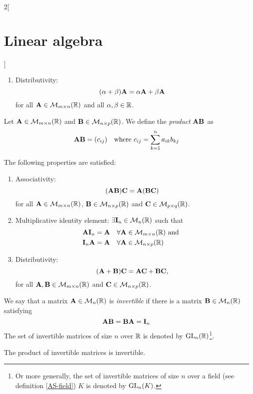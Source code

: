 \documentclass[../../../main.tex]{subfiles}
\begin{document}
\begin{multicols}{2}[\section{Linear algebra}]
\begin{prop}
\begin{enumerate}
      \item Distributivity: $$(\alpha+\beta)\vb{A}=\alpha\vb{A}+\beta\vb{A}$$ for all $\vb{A}\in\mathcal{M}_{m\times n}(\mathbb{R})$ and all $\alpha,\beta\in\mathbb{R}$.
    \end{enumerate}
  \end{prop}
  \begin{definition}
    Let $\vb{A}\in\mathcal{M}_{m\times n}(\mathbb{R})$ and $\vb{B}\in\mathcal{M}_{n\times p}(\mathbb{R})$. We define the \textit{product $\vb{A}\vb{B}$} as $$\vb{A}\vb{B}=(c_{ij})\quad\text{where }c_{ij}=\sum_{k=1}^na_{ik}b_{kj}$$
  \end{definition}
  \begin{prop}
    The following properties are satisfied:
    \begin{enumerate}
      \item Associativity: $$(\vb{A}\vb{B})\vb{C}=\vb{A}(\vb{B}\vb{C})$$ for all $\vb{A}\in\mathcal{M}_{m\times n}(\mathbb{R})$, $\vb{B}\in\mathcal{M}_{n\times p}(\mathbb{R})$ and $\vb{C}\in\mathcal{M}_{p\times q}(\mathbb{R})$.
      \item Multiplicative identity element: $\exists\vb{I}_n\in\mathcal{M}_n(\mathbb{R})$ such that
            \begin{align*}
               & \vb{A}\vb{I}_n=\vb{A}\quad\forall\vb{A}\in\mathcal{M}_{m\times n}(\mathbb{R})\text{ and } \\
               & \vb{I}_n\vb{A}=\vb{A}\quad\forall\vb{A}\in\mathcal{M}_{n\times p}(\mathbb{R})
            \end{align*}
      \item Distributivity: $$(\vb{A}+\vb{B})\vb{C}=\vb{A}\vb{C}+\vb{B}\vb{C},$$ for all $\vb{A},\vb{B}\in\mathcal{M}_{m\times n}(\mathbb{R})$ and $\vb{C}\in\mathcal{M}_{n\times p}(\mathbb{R})$.
    \end{enumerate}
  \end{prop}
  \begin{definition}
    We say that a matrix $\vb{A}\in\mathcal{M}_n(\mathbb{R})$ is \textit{invertible} if there is a matrix $\vb{B}\in\mathcal{M}_n(\mathbb{R})$ satisfying $$\vb{A}\vb{B}=\vb{B}\vb{A}=\vb{I}_n$$
    The set of invertible matrices of size $n$ over $\mathbb{R}$ is denoted by $\mathrm{GL}_n(\mathbb{R})$\footnote{Or more generally, the set of invertible matrices of size $n$ over a field (see definition \ref{AS-field}) $K$ is denoted by $\mathrm{GL}_n(K)$.}.
  \end{definition}
  \begin{lemma}
    The product of invertible matrices is invertible.
  \end{lemma}

\end{multicols}
\end{document}
